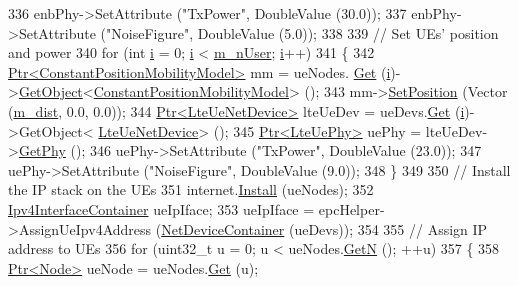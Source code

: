 \begin{DoxyCode}
336   enbPhy->SetAttribute (\textcolor{stringliteral}{"TxPower"}, DoubleValue (30.0));
337   enbPhy->SetAttribute (\textcolor{stringliteral}{"NoiseFigure"}, DoubleValue (5.0));
338 
339   \textcolor{comment}{// Set UEs' position and power}
340   \textcolor{keywordflow}{for} (\textcolor{keywordtype}{int} \hyperlink{bernuolliDistribution_8m_a6f6ccfcf58b31cb6412107d9d5281426}{i} = 0; \hyperlink{bernuolliDistribution_8m_a6f6ccfcf58b31cb6412107d9d5281426}{i} < \hyperlink{classLenaPssFfMacSchedulerTestCase1_ad87e97f01764401f397bb0778b2cb424}{m\_nUser}; \hyperlink{bernuolliDistribution_8m_a6f6ccfcf58b31cb6412107d9d5281426}{i}++)
341     \{
342       \hyperlink{classns3_1_1Ptr}{Ptr<ConstantPositionMobilityModel>} mm = ueNodes.
      \hyperlink{classns3_1_1NodeContainer_a9ed96e2ecc22e0f5a3d4842eb9bf90bf}{Get} (\hyperlink{bernuolliDistribution_8m_a6f6ccfcf58b31cb6412107d9d5281426}{i})->\hyperlink{classns3_1_1Object_a13e18c00017096c8381eb651d5bd0783}{GetObject}<\hyperlink{classns3_1_1ConstantPositionMobilityModel}{ConstantPositionMobilityModel}> ();
343       mm->\hyperlink{classns3_1_1MobilityModel_ac584b3d5a309709d2f13ed6ada1e7640}{SetPosition} (Vector (\hyperlink{classLenaPssFfMacSchedulerTestCase1_a17392bb7159b961dac39323e5dcdc554}{m\_dist}, 0.0, 0.0));
344       \hyperlink{classns3_1_1Ptr}{Ptr<LteUeNetDevice>} lteUeDev = ueDevs.\hyperlink{classns3_1_1NetDeviceContainer_a677d62594b5c9d2dea155cc5045f4d0b}{Get} (\hyperlink{bernuolliDistribution_8m_a6f6ccfcf58b31cb6412107d9d5281426}{i})->GetObject<
      \hyperlink{classns3_1_1LteUeNetDevice}{LteUeNetDevice}> ();
345       \hyperlink{classns3_1_1Ptr}{Ptr<LteUePhy>} uePhy = lteUeDev->\hyperlink{classns3_1_1LteUeNetDevice_a2a9940a1e457a8bf3dae87fed4199c7a}{GetPhy} ();
346       uePhy->SetAttribute (\textcolor{stringliteral}{"TxPower"}, DoubleValue (23.0));
347       uePhy->SetAttribute (\textcolor{stringliteral}{"NoiseFigure"}, DoubleValue (9.0));
348     \}
349 
350   \textcolor{comment}{// Install the IP stack on the UEs}
351   internet.\hyperlink{classns3_1_1InternetStackHelper_a6645b412f31283d2d9bc3d8a95cebbc0}{Install} (ueNodes);
352   \hyperlink{classns3_1_1Ipv4InterfaceContainer}{Ipv4InterfaceContainer} ueIpIface;
353   ueIpIface = epcHelper->AssignUeIpv4Address (\hyperlink{classns3_1_1NetDeviceContainer}{NetDeviceContainer} (ueDevs));
354 
355   \textcolor{comment}{// Assign IP address to UEs}
356   \textcolor{keywordflow}{for} (uint32\_t u = 0; u < ueNodes.\hyperlink{classns3_1_1NodeContainer_aed647ac56d0407a7706aba02eb44b951}{GetN} (); ++u)
357     \{
358       \hyperlink{classns3_1_1Ptr}{Ptr<Node>} ueNode = ueNodes.\hyperlink{classns3_1_1NodeContainer_a9ed96e2ecc22e0f5a3d4842eb9bf90bf}{Get} (u);

\end{DoxyCode}
